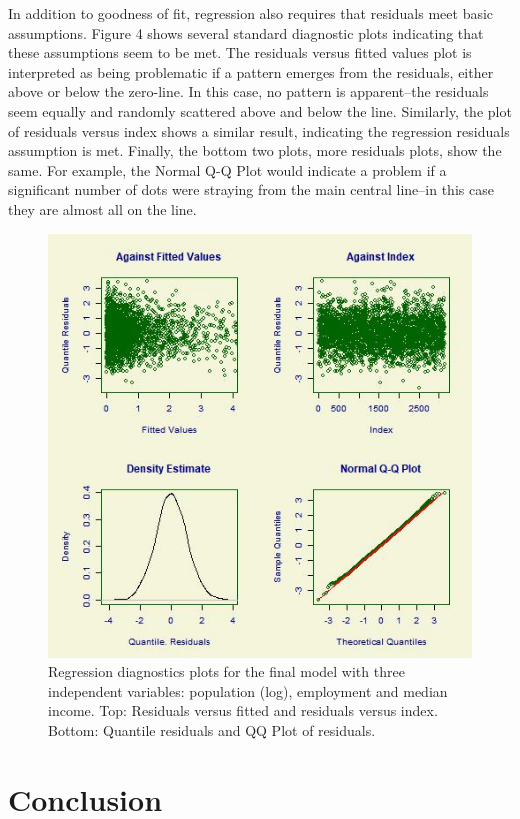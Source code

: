 \documentclass[sigconf]{acmart}
\begin{document}
In addition to goodness of fit, regression also requires that residuals meet basic assumptions.  Figure 4 shows several standard diagnostic plots indicating that these assumptions seem to be met.  The residuals versus fitted values plot is interpreted as being problematic if a pattern emerges from the residuals, either above or below the zero-line.  In this case, no pattern is apparent--the residuals seem equally and randomly scattered above and below the line.  Similarly, the plot of residuals versus index shows a similar result, indicating the regression residuals assumption is met.  Finally, the bottom two plots, more residuals plots, show the same.  For example, the Normal Q-Q Plot would indicate a problem if a significant number of dots were straying from the main central line--in this case they are almost all on the line. \cite{hocking}

\begin{figure}
\includegraphics[width=1.0\textwidth]{images/figure4.jpg}
\caption{Regression diagnostics plots for the final model with three independent variables: population (log), employment and median income. Top: Residuals versus fitted and residuals versus index.  Bottom: Quantile residuals and QQ Plot of residuals. }
\end{figure}


\section{Conclusion}

 
\end{document}
